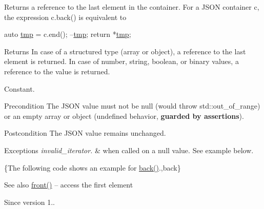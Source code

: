 Returns a reference to the last element in the container. For a J\+S\+ON container {\ttfamily c}, the expression {\ttfamily c.\+back()} is equivalent to 
\begin{DoxyCode}
\textcolor{keyword}{auto} \hyperlink{view_8cpp_a5c164fe165bdff98f887ade2436b7f06}{tmp} = c.end();
--\hyperlink{view_8cpp_a5c164fe165bdff98f887ade2436b7f06}{tmp};
\textcolor{keywordflow}{return} *\hyperlink{view_8cpp_a5c164fe165bdff98f887ade2436b7f06}{tmp};
\end{DoxyCode}


\begin{DoxyReturn}{Returns}
In case of a structured type (array or object), a reference to the last element is returned. In case of number, string, boolean, or binary values, a reference to the value is returned.
\end{DoxyReturn}
Constant.

\begin{DoxyPrecond}{Precondition}
The J\+S\+ON value must not be {\ttfamily null} (would throw {\ttfamily std\+::out\+\_\+of\+\_\+range}) or an empty array or object (undefined behavior, {\bfseries guarded by assertions}). 
\end{DoxyPrecond}
\begin{DoxyPostcond}{Postcondition}
The J\+S\+ON value remains unchanged.
\end{DoxyPostcond}

\begin{DoxyExceptions}{Exceptions}
{\em invalid\+\_\+iterator.} & when called on a {\ttfamily null} value. See example below.\\
\hline
\end{DoxyExceptions}
\{The following code shows an example for {\ttfamily \hyperlink{classnlohmann_1_1basic__json_a30914ad0767ccdc3633f88a906ed7dfa}{back()}}.,back\}

\begin{DoxySeeAlso}{See also}
\hyperlink{classnlohmann_1_1basic__json_a5417ca43ae5e7a3a2f82eee2d915c6ed}{front()} -- access the first element
\end{DoxySeeAlso}
\begin{DoxySince}{Since}
version 1.. 
\end{DoxySince}

